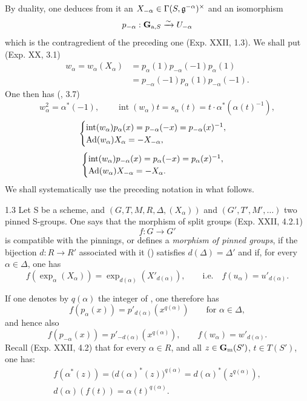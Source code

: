 By duality, one deduces from it an $X_{-\alpha}\in\Gamma(S,\mathfrak g^{-\alpha})^\times$ and an isomorphism
\[
p_{-\alpha}:\mathbf G_{\mathrm a,S}\xrightarrow{\sim} U_{-\alpha}
\]
which is the contragredient of the preceding one (Exp. XXII, 1.3). We shall put (Exp. XX, 3.1)
\[
\begin{split}
w_\alpha=w_\alpha(X_\alpha)&=p_\alpha(1)p_{-\alpha}(-1)p_\alpha(1)\\
&=p_{-\alpha}(-1)p_\alpha(1)p_{-\alpha}(-1).
\end{split}
\]
One then has (, 3.7)
\[
w_\alpha^2=\alpha^*(-1),\qquad \operatorname{int}(w_\alpha)t=s_\alpha(t)=t\cdot\alpha^*(\alpha(t)^{-1}),
\]
\[
\begin{cases}
\operatorname{int}(w_\alpha)p_\alpha(x)=p_{-\alpha}(-x)=p_{-\alpha}(x)^{-1},\\
\operatorname{Ad}(w_\alpha)X_\alpha=-X_{-\alpha},
\end{cases}
\]
\[
\begin{cases}
\operatorname{int}(w_\alpha)p_{-\alpha}(x)=p_\alpha(-x)=p_\alpha(x)^{-1},\\
\operatorname{Ad}(w_\alpha)X_{-\alpha}=-X_\alpha.
\end{cases}
\]
We shall systematically use the preceding notation in what follows.

\begin{definition}{1.3}\label{XXIII.1.3}
Let S be a scheme, and $(G,T,M,R,\Delta,(X_\alpha))$ and $(G',T',M',\ldots)$ two pinned S-groups. One says that the morphism of split groups (Exp. XXII, 4.2.1)
\[
f:G\to G'
\]
is compatible with the pinnings, or defines a \emph{morphism of pinned groups}, if the bijection $d:R\to R'$ associated with it (\cf \loccit) satisfies $d(\Delta)=\Delta'$ and if, for every $\alpha\in\Delta$, one has
\[
f(\exp_\alpha(X_\alpha))=\exp_{d(\alpha)}(X'_{d(\alpha)}),\qquad\text{i.e.}\quad f(u_\alpha)=u'_{d(\alpha)}.
\]
\end{definition}

If one denotes by $q(\alpha)$ the integer of \loccit, one therefore has
\[
f(p_\alpha(x))=p'_{d(\alpha)}(x^{q(\alpha)})\qquad\text{for }\alpha\in\Delta,
\]
and hence also
\[
f(p_{-\alpha}(x))=p'_{-d(\alpha)}(x^{q(\alpha)}),\qquad f(w_\alpha)=w'_{d(\alpha)}.
\]
Recall (Exp. XXII, 4.2) that for every $\alpha\in R$, and all $z\in\mathbf{G}_{\mathrm{m}}(S')$, $t\in T(S')$, one has:
\[
\begin{gathered}
f(\alpha^*(z))=\bigl(d(\alpha)^*(z)\bigr)^{q(\alpha)}=d(\alpha)^*(z^{q(\alpha)}),\\
d(\alpha)(f(t))=\alpha(t)^{q(\alpha)}.
\end{gathered}
\]

